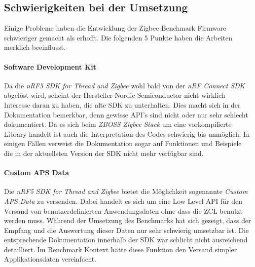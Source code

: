 \subsection{Schwierigkeiten bei der Umsetzung}\label{subsec:ZigbeeSchwierigkeitenbeiderUmsetzung}
Einige Probleme haben die Entwicklung der Zigbee Benchmark Firmware schwieriger gemacht als erhofft.
Die folgenden 5 Punkte haben die Arbeiten merklich beeinflusst. 

\paragraph{Software Development Kit}
Da die \textit{nRF5 SDK for Thread and Zigbee} wohl bald von der \textit{nRF Connect SDK} abgelöst wird, scheint der Hersteller Nordic Semiconductor nicht wirklich Interesse daran zu haben, die \glqq alte\grqq{} SDK zu unterhalten.
Dies macht sich in der Dokumentation bemerkbar, denn gewisse API's sind nicht oder nur sehr schlecht dokumentiert.
Da es sich beim \textit{ZBOSS Zigbee Stack} um eine vorkompilierte Library handelt ist auch die Interpretation des Codes schwierig bis unmöglich.
In einigen Fällen verweist die Dokumentation sogar auf Funktionen und Beispiele die in der aktuellsten Version der SDK nicht mehr verfügbar sind.

\paragraph{Custom APS Data}
Die \textit{nRF5 SDK for Thread and Zigbee} bietet die Möglichkeit sogenannte \textit{Custom APS Data} zu versenden.
Dabei handelt es sich um eine Low Level API für den Versand von benutzerdefinierten Anwendungsdaten ohne dass die ZCL benutzt werden muss.
Während der Umsetzung des Benchmarks hat sich gezeigt, dass der Empfang und die Auswertung dieser Daten nur sehr schwierig umsetzbar ist.
Die entsprechende Dokumentation innerhalb der SDK war schlicht nicht ausreichend detailliert.
Im Benchmark Kontext hätte diese Funktion den Versand simpler Applikationsdaten vereinfacht.

